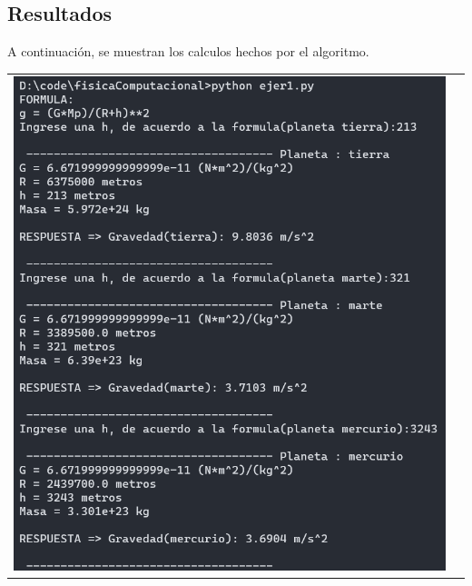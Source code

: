 \documentclass[a4paper,12pt]{article}
\begin{document}
    \subsection{Resultados}
    A continuación, se muestran los calculos hechos por el algoritmo.
        \begin{table}[!htbp]
            \centering
            \begin{tabular}{cc}
                \begin{minipage}{.3\textwidth}
                    \includegraphics[width=\linewidth]{e1_1}
                \end{minipage}&\begin{minipage}{.3\textwidth}

\end{minipage}
\end{tabular}
\end{table}
\end{document}
